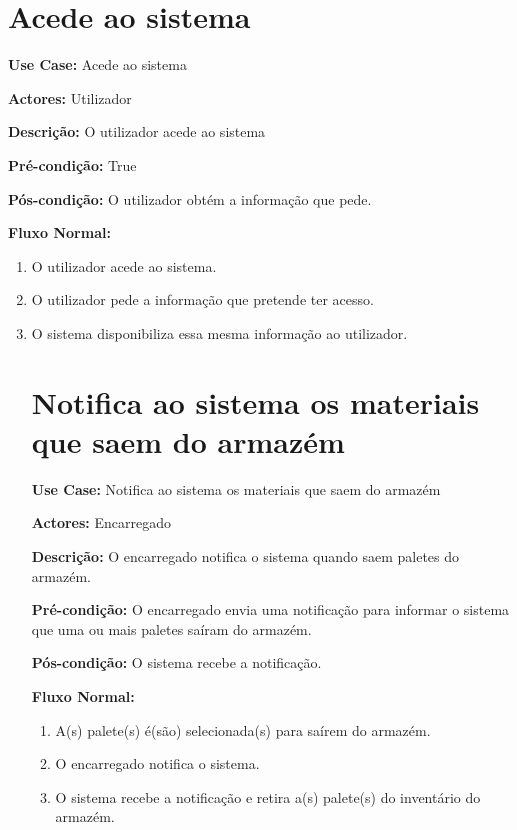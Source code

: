 \documentclass[a4paper]{report}
\begin{document}
\newpage

\section{Acede ao sistema}

\textbf{Use Case:} Acede ao sistema

\textbf{Actores:} Utilizador

\textbf{Descrição:} O utilizador acede ao sistema 

\textbf{Pré-condição:}  True

\textbf{Pós-condição:} O utilizador obtém a informação que pede.

\textbf{Fluxo Normal:} 
\begin{enumerate}

    \item  O utilizador acede ao sistema.
    \item O utilizador pede a informação que pretende ter acesso.
    \item O sistema disponibiliza essa mesma informação ao utilizador.

\newpage

\section{Notifica ao sistema os materiais que saem do armazém}

\textbf{Use Case:} Notifica ao sistema os materiais que saem do armazém

\textbf{Actores:} Encarregado

\textbf{Descrição:} O encarregado notifica o sistema quando saem paletes do armazém.

\textbf{Pré-condição:} O encarregado envia uma notificação para informar o sistema que uma ou mais paletes saíram do armazém.

\textbf{Pós-condição:} O sistema recebe a notificação.

\textbf{Fluxo Normal:} 
\begin{enumerate}

    \item A(s) palete(s) é(são) selecionada(s) para saírem do armazém.
    \item O encarregado notifica o sistema.
    \item O sistema recebe a notificação e retira a(s) palete(s) do inventário do armazém.
\end{enumerate}


\end{enumerate}
\end{document}
